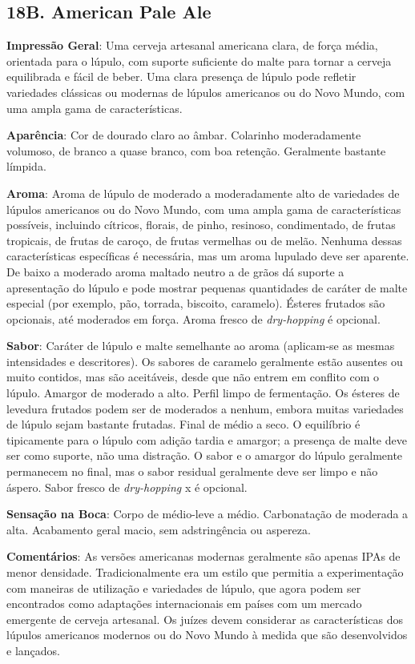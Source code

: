 \subsection*{18B. American Pale Ale}
\textbf{Impressão Geral}: Uma cerveja artesanal americana clara, de força média, orientada para o lúpulo, com suporte suficiente do malte para tornar a cerveja equilibrada e fácil de beber. Uma clara presença de lúpulo pode refletir variedades clássicas ou modernas de lúpulos americanos ou do Novo Mundo, com uma ampla gama de características.

\textbf{Aparência}: Cor de dourado claro ao âmbar. Colarinho moderadamente volumoso, de branco a quase branco, com boa retenção. Geralmente bastante límpida.

\textbf{Aroma}: Aroma de lúpulo de moderado a moderadamente alto de variedades de lúpulos americanos ou do Novo Mundo, com uma ampla gama de características possíveis, incluindo cítricos, florais, de pinho, resinoso, condimentado, de frutas tropicais, de frutas de caroço, de frutas vermelhas ou de melão. Nenhuma dessas características específicas é necessária, mas um aroma lupulado deve ser aparente. De baixo a moderado aroma maltado neutro a de grãos dá suporte a apresentação do lúpulo e pode mostrar pequenas quantidades de caráter de malte especial (por exemplo, pão, torrada, biscoito, caramelo). Ésteres frutados são opcionais, até moderados em força. Aroma fresco de \textit{dry-hopping} é opcional.

\textbf{Sabor}: Caráter de lúpulo e malte semelhante ao aroma (aplicam-se as mesmas intensidades e descritores). Os sabores de caramelo geralmente estão ausentes ou muito contidos, mas são aceitáveis, desde que não entrem em conflito com o lúpulo. Amargor de moderado a alto. Perfil limpo de fermentação. Os ésteres de levedura frutados podem ser de moderados a nenhum, embora muitas variedades de lúpulo sejam bastante frutadas. Final de médio a seco. O equilíbrio é tipicamente para o lúpulo com adição tardia e amargor; a presença de malte deve ser como suporte, não uma distração. O sabor e o amargor do lúpulo geralmente permanecem no final, mas o sabor residual geralmente deve ser limpo e não áspero. Sabor fresco de \textit{dry-hopping} x  é opcional.

\textbf{Sensação na Boca}: Corpo de médio-leve a médio. Carbonatação de moderada a alta. Acabamento geral macio, sem adstringência ou aspereza.

\textbf{Comentários}: As versões americanas modernas geralmente são apenas IPAs de menor densidade. Tradicionalmente era um estilo que permitia a experimentação com maneiras de utilização e variedades de lúpulo, que agora podem ser encontrados como adaptações internacionais em países com um mercado emergente de cerveja artesanal. Os juízes devem considerar as características dos lúpulos americanos modernos ou do Novo Mundo à medida que são desenvolvidos e lançados.

